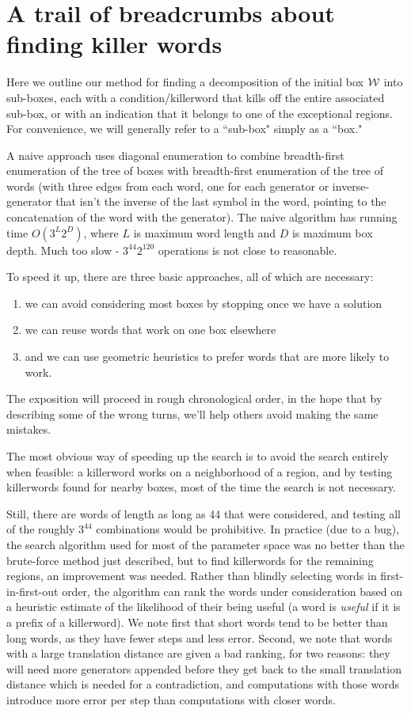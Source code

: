 \section{A trail of breadcrumbs about finding killer words}

Here we outline our method for finding a decomposition of
the initial box ${\cal W}$ into sub-boxes,
each with a condition/killerword that kills off the entire associated sub-box,
or with an indication that it belongs to one of the exceptional regions.
For convenience, we will generally refer to a ``sub-box" simply as a ``box."

A naive approach uses diagonal enumeration
to combine breadth-first enumeration of the tree of boxes
with breadth-first enumeration of the tree of words
(with three edges from each word,
one for each generator or inverse-generator
that isn't the inverse of the last symbol in the word,
pointing to the concatenation of the word with the generator).
The naive algorithm has running time $O(3^L 2^D)$, where $L$ is maximum word length
and $D$ is maximum box depth.
Much too slow - $3^{44} 2^{120}$ operations is not close to reasonable.

To speed it up, there are three basic approaches, all of which are necessary:
\begin{enumerate}
  \item we can avoid considering most boxes by stopping once we have a solution
  \item we can reuse words that work on one box elsewhere
  \item and we can use geometric heuristics to prefer words
        that are more likely to work.
\end{enumerate}
The exposition will proceed in rough chronological order,
in the hope that by describing some of the wrong turns,
we'll help others avoid making the same mistakes.

The most obvious way of speeding up the search is to avoid
the search entirely when feasible: a killerword works on a neighborhood of a
region, and by testing killerwords found for nearby boxes, most of
the time the search is not necessary.

Still, there are words of length as long as 44 that were considered,
and testing all of the roughly $3^{44}$ combinations would be prohibitive.
In practice (due to a bug), the search algorithm used for most of the parameter
space was no better than the brute-force method just described,
but to find killerwords for the remaining regions, an improvement was needed.
Rather than blindly selecting words in first-in-first-out order,
the algorithm can rank the words under consideration
based on a heuristic estimate of the likelihood of their being useful
(a word is {\it useful} if it is a prefix of a killerword).
We note first that short words tend to be better than long words,
as they have fewer steps and less error.
Second, we note that words
with a large translation distance are given a bad ranking, for two reasons:
they will need more generators appended before they get back to the
small translation distance which is needed for a contradiction, and
computations with those words introduce more error per step than
computations with closer words.

